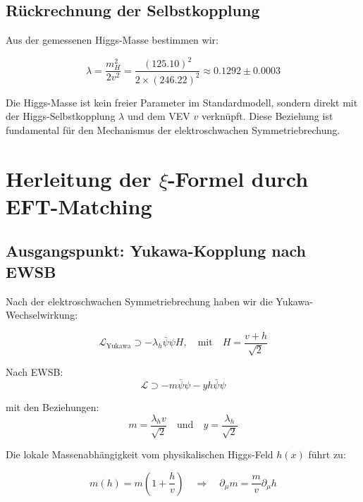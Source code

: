 \documentclass[12pt,a4paper]{article}
\theoremstyle{definition}
\begin{document}
	\subsection{Rückrechnung der Selbstkopplung}
	
	Aus der gemessenen Higgs-Masse bestimmen wir:
	
	\begin{equation}
		\lambda = \frac{m_H^2}{2v^2} = \frac{(125.10)^2}{2 \times (246.22)^2} \approx 0.1292 \pm 0.0003
	\end{equation}
	
	\begin{wichtig}
		Die Higgs-Masse ist kein freier Parameter im Standardmodell, sondern direkt mit der Higgs-Selbstkopplung $\lambda$ und dem VEV $v$ verknüpft. Diese Beziehung ist fundamental für den Mechanismus der elektroschwachen Symmetriebrechung.
	\end{wichtig}
	
	\section{Herleitung der $\xi$-Formel durch EFT-Matching}
	
	\subsection{Ausgangspunkt: Yukawa-Kopplung nach EWSB}
	
	Nach der elektroschwachen Symmetriebrechung haben wir die Yukawa-Wechselwirkung:
	
	\begin{equation}
		\mathcal{L}_{\text{Yukawa}} \supset -\lambda_h \bar{\psi}\psi H, \quad \text{mit} \quad H = \frac{v + h}{\sqrt{2}}
	\end{equation}
	
	Nach EWSB:
	\begin{equation}
		\mathcal{L} \supset -m \bar{\psi}\psi - y h \bar{\psi}\psi
	\end{equation}
	
	mit den Beziehungen:
	\begin{equation}
		m = \frac{\lambda_h v}{\sqrt{2}} \quad \text{und} \quad y = \frac{\lambda_h}{\sqrt{2}}
	\end{equation}
	
	Die lokale Massenabhängigkeit vom physikalischen Higgs-Feld $h(x)$ führt zu:
	
	\begin{equation}
		m(h) = m\left(1 + \frac{h}{v}\right) \quad \Rightarrow \quad \partial_\mu m = \frac{m}{v}\partial_\mu h
	\end{equation}
	
\end{document}
